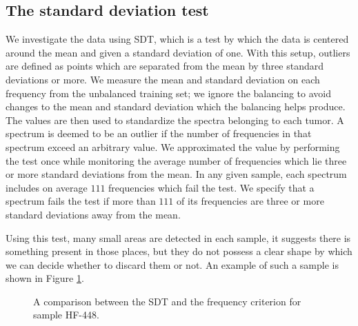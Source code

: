 \subsection{The standard deviation test}

We investigate the data using SDT, which is a test by which the data is centered around the mean and given a standard deviation of one. With this setup, outliers are defined as points which are separated from the mean by three standard deviations or more. We measure the mean and standard deviation on each frequency from the unbalanced training set; we ignore the balancing to avoid changes to the mean and standard deviation which the balancing helps produce. The values are then used to standardize the spectra belonging to each tumor. A spectrum is deemed to be an outlier if the number of frequencies in that spectrum exceed an arbitrary value. We approximated the value by performing the test once while monitoring the average number of frequencies which lie three or more standard deviations from the mean. In any given sample, each spectrum includes on average $111$ frequencies which fail the test. We specify that a spectrum fails the test if more than $111$ of its frequencies are three or more standard deviations away from the mean.

Using this test, many small areas are detected in each sample, it suggests there is something present in those places, but they do not possess a clear shape by which we can decide whether to discard them or not. An example of such a sample is shown in Figure \ref{fig:stdHF448}.

\begin{figure}[H]

    \centering
    \qquad
    \caption{A comparison between the SDT and the frequency criterion for sample HF-448.
\label{fig:stdHF448}}%
\end{figure}

